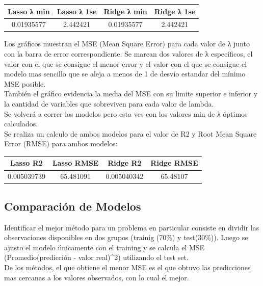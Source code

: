 \begin{center}
 \begin{tabular}{||c c c c||} 
 \hline
    Lasso λ min & Lasso λ 1se & Ridge λ min & Ridge λ 1se  \\ 
 \hline
    0.01935577 & 2.442421 & 0.01935577 & 2.442421\\
 \hline
 \hline
\end{tabular}
\end{center}


Los gráficos muestran el MSE (Mean Square Error) para cada valor de λ junto con la barra de error correspondiente. Se marcan dos valores de λ específicos, el valor con el que se consigue el menor error y el valor con el que se consigue el modelo mas sencillo que se aleja a menos de 1 de desvío estandar del mínimo MSE posible. \\
También el gráfico evidencia la media del MSE con su limite superior e inferior y la cantidad de variables que sobreviven para cada valor de lambda.\\
Se volverá a correr los modelos pero esta ves con los valores min de λ óptimos calculados.\\

Se realiza un calculo de ambos modelos para el valor de R2 y Root Mean Square Error (RMSE) para ambos modelos:


\begin{center}
 \begin{tabular}{||c c c c||} 
 \hline
    Lasso R2 & Lasso RMSE & Ridge R2 & Ridge RMSE  \\ 
 \hline
    0.005039739 & 65.481091 & 0.005040342 & 65.48107\\
 \hline
 \hline
\end{tabular}
\end{center}


\subsection{Comparación de Modelos}

Identificar el mejor método para un problema en particular consiste en dividir las observaciones disponibles en dos grupos (trainig (70\%) y test(30\%)). Luego se ajusto el modelo únicamente con el training y se calcula el MSE \left(Promedio\left(predicción - valor real\right)^{2}\right) utilizando el test set.\\

De los métodos, el que obtiene el menor MSE es el que obtuvo las predicciones mas cercanas a los valores observados, con lo cual el mejor.










